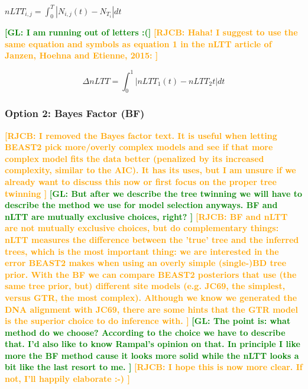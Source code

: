 \documentclass{article}
\newcommand*\richel[1]{\textcolor{orange}{\textbf{[RJCB: #1]}}}
\newcommand*\gio[1]{\textcolor{green}{\textbf{[GL: #1]}}}
\begin{document}
\begin{itemize}
$nLTT_{i,j} = \int_{0}^{T} | N_{i,j}(t) - N_{T_{i}} | dt$

\gio{I am running out of letters :(}
\richel{Haha! I suggest to use the same equation and symbols 
  as equation 1 in
  the nLTT article of Janzen, Hoehna and Etienne, 2015:
}

$$
\Delta nLTT = \int_{0}^{1} | nLTT_1(t) - nLTT_2{t} | dt
$$

\subsubsection{Option 2: Bayes Factor (BF)}

\richel{
  I removed the Bayes factor text. It is useful when letting BEAST2
  pick more/overly complex models and see if that more complex model fits the
  data better (penalized by its increased complexity, similar to the AIC). It has
  its uses, but I am unsure if we already want to discuss this now
  or first focus on the proper tree twinning
}
\gio{
  But after we describe the tree twinning we will have to describe 
  the method we use for model selection anyways. 
  BF and nLTT are mutually exclusive choices, right?
}
\richel{
  BF and nLTT are not mutually exclusive choices, but do complementary things:
  nLTT measures the difference between the 'true' tree and the inferred trees,
  which is the most important thing: we are interested in the error BEAST2
  makes when using an overly simple (single-)BD tree prior.
  With the BF we can compare BEAST2 posteriors that use (the same
  tree prior, but) different site models (e.g. JC69, the simplest, 
  versus GTR, the most complex). Although we know we generated the DNA
  alignment with JC69, there are some hints that the GTR model is the
  superior choice to do inference with.
}
\gio{
  The point is: what method do we choose? 
  According to the choice we have to describe that. 
  I'd also like to know Rampal's opinion on that. 
  In principle I like more the BF method cause it looks 
  more solid while the nLTT looks a bit like the last resort to me.
}
\richel{
  I hope this is now more clear. If not, I'll happily
  elaborate :-)
}

\end{itemize}

\end{document}
